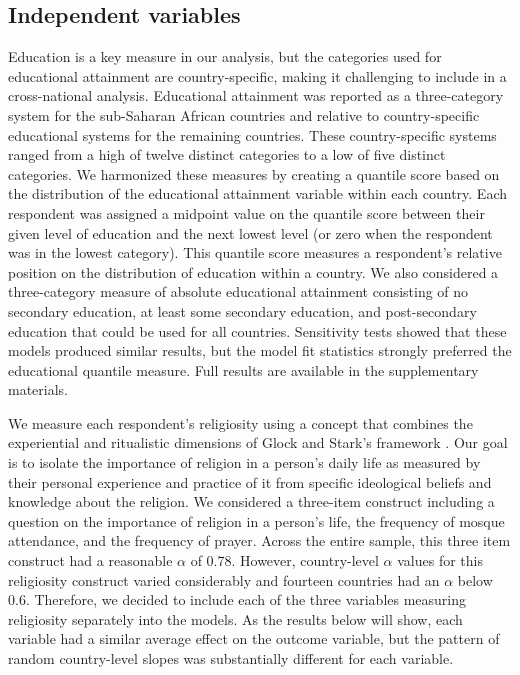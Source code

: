 \documentclass[10pt,letterpaper]{article}
\begin{document}
\subsection*{Independent variables}

Education is a key measure in our analysis, but the categories used for educational attainment are country-specific, making it challenging to include in a cross-national analysis. Educational attainment was reported as a three-category system for the sub-Saharan African countries and relative to country-specific educational systems for the remaining countries. These country-specific systems ranged from a high of twelve distinct categories to a low of five distinct categories. We harmonized these measures by creating a quantile score based on the distribution of the educational attainment variable within each country. Each respondent was assigned a midpoint value on the quantile score between their given level of education and the next lowest level (or zero when the respondent was in the lowest category). This quantile score measures a respondent's relative position on the distribution of education within a country. We also considered a three-category measure of absolute educational attainment consisting of no secondary education, at least some secondary education, and post-secondary education that could be used for all countries. Sensitivity tests showed that these models produced similar results, but the model fit statistics strongly preferred the educational quantile measure. Full results are available in the supplementary materials.

We measure each respondent's religiosity using a concept that combines the experiential and ritualistic dimensions of Glock and Stark's framework \cite{glock_religion_1965}. Our goal is to isolate the importance of religion in a person's daily life as measured by their personal experience and practice of it from specific ideological beliefs and knowledge about the religion. We considered a three-item construct including a question on the importance of religion in a person's life, the frequency of mosque attendance, and the frequency of prayer. Across the entire sample, this three item construct had a reasonable \(\alpha\) of 0.78. However, country-level \(\alpha\) values for this religiosity construct varied considerably and fourteen countries had an \(\alpha\) below 0.6. Therefore, we decided to include each of the three variables measuring religiosity separately into the models. As the results below will show, each variable had a similar average effect on the outcome variable, but the pattern of random country-level slopes was substantially different for each variable.
\end{document}
